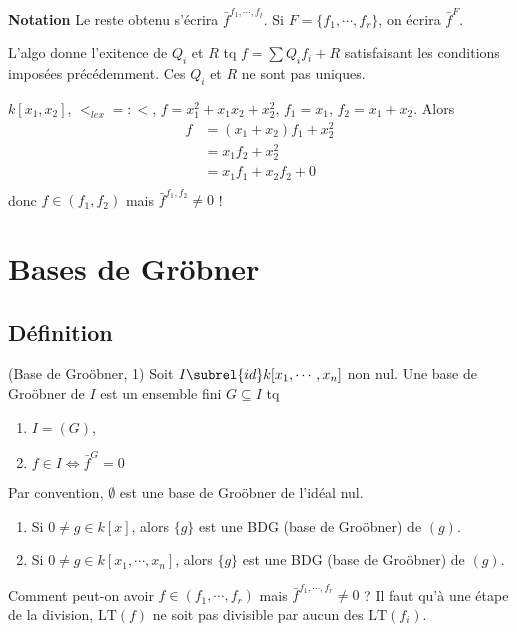             \textbf{Notation} Le reste obtenu s'écrira $\bar f^{f_1, \cdots, f_t}$. Si $F = \{f_1, \cdots, f_r\}$, on écrira $\bar f^F$.
            \begin{remq}
                L'algo donne l'exitence de $Q_i$ et $R$ tq $f = \sum Q_if_i + R$ satisfaisant les conditions imposées précédemment. Ces $Q_i$ et $R$ ne sont pas uniques.
            \end{remq}
            \begin{expl}
                $k[x_1, x_2]$, $<_{lex} =: <$, $f = x_1^2 + x_1x_2 + x_2^2$, $f_1 = x_1$, $f_2 = x_1 + x_2$. Alors 
                \begin{align*}
                    f &= (x_1 + x_2)f_1 + x_2^2 \\
                    &= x_1f_2 + x_2^2 \\
                    &= x_1f_1 + x_2f_2 + 0 \\
                \end{align*}
                donc $f \in (f_1, f_2)$ mais $\bar f^{f_1, f_2} \neq 0$ !
            \end{expl}

    \section{Bases de Gröbner}
        \subsection{Définition}
            \begin{defi} (Base de Groöbner, 1)
                Soit $I \subrel{id} k[x_1, \cdots, x_n]$ non nul. Une base de Groöbner de $I$ est un ensemble fini $G \subseteq I$ tq
                \begin{enumerate}
                    \item $I = (G)$,
                    \item $f \in I \iff \bar f^G = 0$
                \end{enumerate}
            \end{defi}
            Par convention, $\emptyset$ est une base de Groöbner de l'idéal nul.
            \begin{expl}
                \begin{enumerate}
                    \item Si $0 \neq g \in k[x]$, alors $\{g\}$ est une BDG (base de Groöbner) de $(g)$.
                    \item Si $0 \neq g \in k[x_1, \cdots, x_n]$, alors $\{g\}$ est une BDG (base de Groöbner) de $(g)$.
                \end{enumerate}
            \end{expl}
            Comment peut-on avoir $f \in (f_1, \cdots, f_r)$ mais $\bar f^{f_1, \cdots, f_r} \neq 0$ ? Il faut qu'à une étape de la division, $\mathrm{LT}(f)$ ne soit pas divisible par aucun des $\mathrm{LT}(f_i)$. 
        
